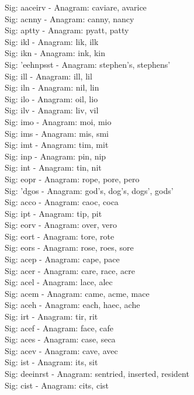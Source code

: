 Sig: {aaceirv} - Anagram: caviare, avarice \\
Sig: {acnny} - Anagram: canny, nancy \\
Sig: {aptty} - Anagram: pyatt, patty \\
Sig: {ikl} - Anagram: lik, ilk \\
Sig: {ikn} - Anagram: ink, kin \\
Sig: {'eehnpsst} - Anagram: stephen's, stephens' \\
Sig: {ill} - Anagram: ill, lil \\
Sig: {iln} - Anagram: nil, lin \\
Sig: {ilo} - Anagram: oil, lio \\
Sig: {ilv} - Anagram: liv, vil \\
Sig: {imo} - Anagram: moi, mio \\
Sig: {ims} - Anagram: mis, smi \\
Sig: {imt} - Anagram: tim, mit \\
Sig: {inp} - Anagram: pin, nip \\
Sig: {int} - Anagram: tin, nit \\
Sig: {eopr} - Anagram: rope, pore, pero \\
Sig: {'dgos} - Anagram: god's, dog's, dogs', gods' \\
Sig: {acco} - Anagram: caoc, coca \\
Sig: {ipt} - Anagram: tip, pit \\
Sig: {eorv} - Anagram: over, vero \\
Sig: {eort} - Anagram: tore, rote \\
Sig: {eors} - Anagram: rose, roes, sore \\
Sig: {acep} - Anagram: cape, pace \\
Sig: {acer} - Anagram: care, race, acre \\
Sig: {acel} - Anagram: lace, alec \\
Sig: {acem} - Anagram: came, acme, mace \\
Sig: {aceh} - Anagram: each, haec, ache \\
Sig: {irt} - Anagram: tir, rit \\
Sig: {acef} - Anagram: face, cafe \\
Sig: {aces} - Anagram: case, seca \\
Sig: {acev} - Anagram: cave, avec \\
Sig: {ist} - Anagram: its, sit \\
Sig: {deeinrst} - Anagram: sentried, inserted, resident \\
Sig: {cist} - Anagram: cits, cist \\
